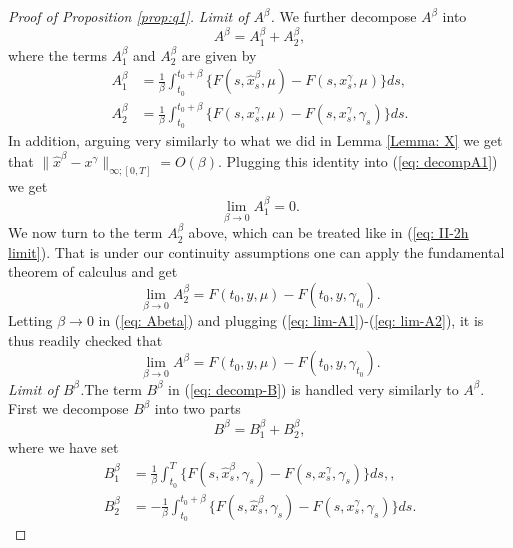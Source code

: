 \documentclass[12pt,reqno]{amsart}
\numberwithin{equation}{section}  %
\newcommand{\1}{{\bf 1}}
\newcommand{\2}{{\bf 2}}
\newcommand{\ga}{\gamma}
\theoremstyle{remark}
\theoremstyle{remark}
\begin{document}
\begin{proof}[Proof of Proposition \ref{prop:q1}]
 \smallskip
\noindent
\textit{Limit of $A^{\beta}$.} We further decompose $A^{\beta}$ into
\begin{equation}
    A^{\beta}=A^{\beta}_{1}+A^{\beta}_{2}, \label{eq: Abeta}
\end{equation}
where the terms $A_{1}^{\beta}$ and $A^{\beta}_{2}$ are given by
\begin{align}
    A^{\beta}_{1}&=\frac{1}{\beta}\int_{t_0}^{t_0+\beta}\{F(s,\hat{x}_{s}^{\beta},\mu)-F(s,x_{s}^{\ga},\mu)\}ds,\label{eq: decompA1}\\
    A^{\beta}_{2}&=\frac{1}{\beta}\int_{t_0}^{t_0+\beta}\{F(s,x_{s}^{\ga},\mu)-F(s,x_{s}^{\ga},\ga_{s})\}ds. \label{eq: decompA2}
\end{align}
In addition, arguing very similarly to what we did in Lemma \ref{Lemma: X} we get that $\|\hat{x}^{\beta}-x^{\ga}\|_{\infty;[0,T]}=O(\beta)$. Plugging this identity into (\ref{eq: decompA1}) we get
\begin{equation}
    \lim_{\beta\to 0}A_{1}^{\beta}= 0 \label{eq: lim-A1}.
\end{equation}
We now turn to the term $A_{2}^{\beta}$ above, which can be treated like in (\ref{eq: II-2h limit}). That is under our continuity assumptions one can apply the fundamental theorem of calculus and get
\begin{equation}
    \lim_{\beta \to 0}A_{2}^{\beta}=F(t_0,y,\mu)-F(t_0,y,\ga_{t_0}).\label{eq: lim-A2}
\end{equation}
Letting $\beta\to 0$ in (\ref{eq: Abeta}) and plugging (\ref{eq: lim-A1})-(\ref{eq: lim-A2}), it is thus readily checked that
\begin{equation}\label{eq: limitA}
    \lim_{\beta \to 0}A^{\beta}=F(t_0,y,\mu)-F(t_0,y,\ga_{t_0}).
\end{equation}
 \smallskip
\noindent
\textit{Limit of $B^{\beta}$.}The term $B^{\beta}$ in (\ref{eq: decomp-B}) is handled very similarly to $A^{\beta}$. First we decompose $B^{\beta}$ into two parts
\begin{equation} \label{eq: Bbeta}
    B^{\beta}=B^{\beta}_{1}+B^{\beta}_{2},
\end{equation}
where we have set
\begin{align}
    B^{\beta}_{1}&=\frac{1}{\beta}\int_{t_0}^{T}\{F(s,\hat{x}_{s}^{\beta},\ga_{s})-F(s,x_{s}^{\ga},\ga_{s})\}ds,, \label{eq: decomp-B1}\\
    B^{\beta}_{2}&= -\frac{1}{\beta}\int_{t_0}^{t_0+\beta}\{F(s,\hat{x}_{s}^{\beta},\ga_{s})-F(s,x_{s}^{\ga},\ga_{s})\}ds \label{eq: decomp-B2}.
\end{align}

\end{proof}
\end{document}
